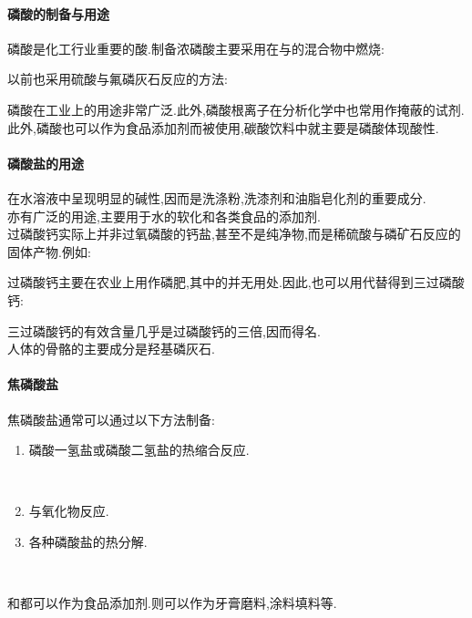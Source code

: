 \documentclass{ctexart}
\begin{document}
\paragraph{磷酸的制备与用途}
磷酸是化工行业重要的酸.制备浓磷酸主要采用在与的混合物中燃烧:
\begin{center}
\end{center}
以前也采用硫酸与氟磷灰石反应的方法:
\begin{center}
\end{center}
磷酸在工业上的用途非常广泛.此外,磷酸根离子在分析化学中也常用作掩蔽的试剂.此外,磷酸也可以作为食品添加剂而被使用,碳酸饮料中就主要是磷酸体现酸性.
\paragraph{磷酸盐的用途}
在水溶液中呈现明显的碱性,因而是洗涤粉,洗漆剂和油脂皂化剂的重要成分.\\
\indent{}亦有广泛的用途,主要用于水的软化和各类食品的添加剂.\\
\indent 过磷酸钙实际上并非过氧磷酸的钙盐,甚至不是纯净物,而是稀硫酸与磷矿石反应的固体产物.例如:
\begin{center}
\end{center}
过磷酸钙主要在农业上用作磷肥,其中的并无用处.因此,也可以用代替得到三过磷酸钙:
\begin{center}
\end{center}
三过磷酸钙的有效含量几乎是过磷酸钙的三倍,因而得名.\\
\indent 人体的骨骼的主要成分是羟基磷灰石.
\paragraph{焦磷酸盐}
焦磷酸盐通常可以通过以下方法制备:
\begin{enumerate}[label=\tbf{\arabic*.},topsep=0pt,parsep=0pt,itemsep=0pt,partopsep=0pt]
    \item 磷酸一氢盐或磷酸二氢盐的热缩合反应.
        \begin{center}
            \ \ \ \ \ 
        \end{center}
    \item {}与氧化物反应.
        \begin{center}
        \end{center}
    \item 各种磷酸盐的热分解.
        \begin{center}
            \ \ \ \ \ 
        \end{center}
\end{enumerate}
\indent {}和都可以作为食品添加剂.则可以作为牙膏磨料,涂料填料等.
\end{document}

